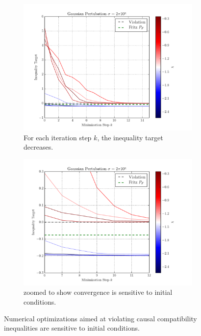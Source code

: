 \documentclass[aps, 10pt, english, twoside, pra, nofootinbib, tightenlines, longbibliography]{revtex4-1}
\begin{document}
    \begin{center}
    \begin{figure}
    \begin{subfigure}[t]{.48\linewidth}
    \includegraphics[width=\linewidth]{../../figures/optimizations/Gaussian_Perturbation_Fritz_Color_Default.pdf}
    \caption{For each iteration step $k$, the inequality target decreases.}\label{fig:initial_conditions_a}
    \end{subfigure}
    \begin{subfigure}[t]{.48\linewidth}
    \includegraphics[width=\linewidth]{../../figures/optimizations/Gaussian_Perturbation_Fritz_Color_Zoomed.pdf}
    \caption{ zoomed to show convergence is sensitive to initial conditions.}\label{fig:initial_conditions_b}
    \end{subfigure}
    \caption{Numerical optimizations aimed at violating causal compatibility inequalities are sensitive to initial conditions.}\label{fig:initial_conditions}
    \end{figure}
    \end{center}
\end{document}
